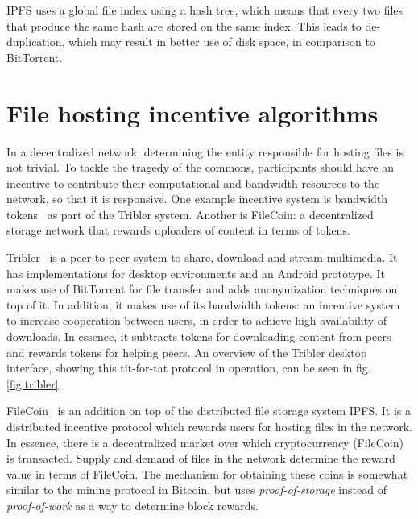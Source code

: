 IPFS uses a global file index using a hash tree, which means that every two files that produce the same hash are stored on the same index. This leads to de-duplication, which may result in better use of disk space, in comparison to BitTorrent.

\section{File hosting incentive algorithms}
\label{sec:file-spreading-incentives}
In a decentralized network, determining the entity responsible for hosting files is not trivial. To tackle the tragedy of the commons, participants should have an incentive to contribute their computational and bandwidth resources to the network, so that it is responsive. One example incentive system is bandwidth tokens~\citep{de2018blockchain} as part of the Tribler system. Another is FileCoin: a decentralized storage network that rewards uploaders of content in terms of tokens.

Tribler~\citep{pouwelse2008tribler} is a peer-to-peer system to share, download and stream multimedia. It has implementations for desktop environments and an Android prototype. It makes use of BitTorrent for file transfer and adds anonymization techniques on top of it. In addition, it makes use of its bandwidth tokens: an incentive system to increase cooperation between users, in order to achieve high availability of downloads. In essence, it subtracts tokens for downloading content from peers and rewards tokens for helping peers. An overview of the Tribler desktop interface, showing this tit-for-tat protocol in operation, can be seen in fig. \ref{fig:tribler}.

FileCoin~\citep{benet2018filecoin} is an addition on top of the distributed file storage system IPFS. It is a distributed incentive protocol which rewards users for hosting files in the network. In essence, there is a decentralized market over which cryptocurrency (FileCoin) is transacted. Supply and demand of files in the network determine the reward value in terms of FileCoin. The mechanism for obtaining these coins is somewhat similar to the mining protocol in Bitcoin, but uses \textit{proof-of-storage} instead of \textit{proof-of-work} as a way to determine block rewards.

